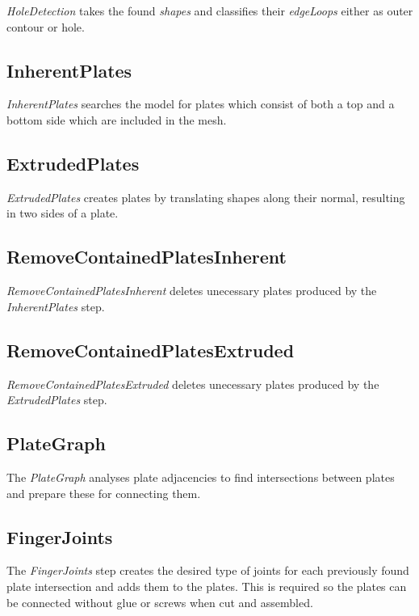 \documentclass[../ClassicThesis.tex]{subfiles}
\begin{document}
\emph{HoleDetection} takes the found \emph{shapes} and classifies their \emph{edgeLoops} either as outer contour or hole.


\subsection*{InherentPlates}

\emph{InherentPlates} searches the model for plates which consist of both a top and a bottom side which are included in the mesh.


\subsection*{ExtrudedPlates}

\emph{ExtrudedPlates} creates plates by translating shapes along their normal, resulting in two sides of a plate.


\subsection*{RemoveContainedPlatesInherent}

\emph{RemoveContainedPlatesInherent} deletes unecessary plates produced by the \emph{InherentPlates} step.


\subsection*{RemoveContainedPlatesExtruded}

\emph{RemoveContainedPlatesExtruded} deletes unecessary plates produced by the \emph{ExtrudedPlates} step.


\subsection*{PlateGraph}

The \emph{PlateGraph} analyses plate adjacencies to find intersections between plates and prepare these for connecting them.

\subsection*{FingerJoints}

The \emph{FingerJoints} step creates the desired type of joints for each previously found plate intersection and adds them to the plates. This is required so the plates can be connected without glue or screws when cut and assembled.
\end{document}

